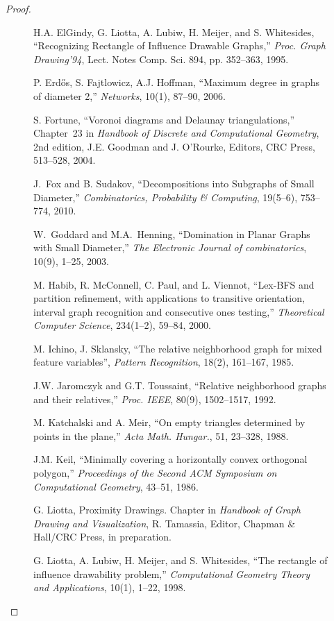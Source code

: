 \documentclass{llncs}
\begin{document}
\begin{proof}
\begin{figure}
\begin{thebibliography}{99}
 H.A. ElGindy, G. Liotta, A. Lubiw, H. Meijer, and S. Whitesides,
``Recognizing Rectangle of Influence Drawable Graphs,''
\emph{Proc. Graph Drawing'94}, Lect. Notes Comp. Sci. 894, 
pp. 352--363, 1995.

 P. Erd\H{o}s, S. Fajtlowicz, A.J. Hoffman,
``Maximum degree in graphs of diameter 2,''
\emph{Networks}, 10(1), 87--90, 2006.

 S. Fortune,
``Voronoi diagrams and Delaunay  triangulations,''
Chapter~23 in \emph{Handbook of Discrete and Computational Geometry},
2nd edition, J.E.  Goodman and J. O'Rourke, Editors,
CRC Press, 513--528, 2004.

 J.~Fox and B. Sudakov,
``Decompositions into Subgraphs of Small Diameter,''
\emph{Combinatorics, Probability \& Computing}, 
19(5--6), 753--774, 2010.

 W.~Goddard and M.A.~Henning,
``Domination in Planar Graphs with Small Diameter,''
\emph{The Electronic Journal of combinatorics},
10(9), 1--25, 2003.


 M. Habib, R. McConnell, C. Paul, and L. Viennot,
``Lex-BFS and partition refinement, with applications to transitive orientation,
interval graph recognition and consecutive ones testing,''
\emph{Theoretical Computer Science}, 234(1--2), 59--84, 2000.


 M. Ichino, J. Sklansky,
``The relative neighborhood graph for mixed feature variables'',
\emph{Pattern Recognition}, 18(2), 161--167, 1985.

  J.W. Jaromczyk and G.T. Toussaint,
``Relative neighborhood graphs and their relatives,''
\emph{Proc. IEEE}, 80(9), 1502--1517, 1992.


M. Katchalski and A. Meir, ``On empty triangles determined by
points in the plane,'' \emph{Acta Math. Hungar.}, 51, 23--328, 1988.

 J.M. Keil,
``Minimally covering a horizontally convex orthogonal polygon,''
\emph{Proceedings of the Second ACM Symposium on Computational Geometry},
43--51, 1986.

 G. Liotta, Proximity Drawings. Chapter in
\emph{Handbook of Graph Drawing and Visualization}, R. Tamassia,
Editor, Chapman \& Hall/CRC Press, in preparation.


  G. Liotta, A. Lubiw, H. Meijer, and S. Whitesides,
``The rectangle of influence drawability problem,''
\emph{Computational Geometry Theory and Applications}, 10(1), 1--22,
1998.


\end{thebibliography}
\end{figure}
\end{proof}
\end{document}
